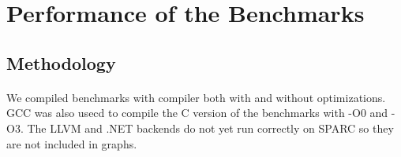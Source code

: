 \documentclass[12pt]{article}
\begin{document}
\section{Performance of the Benchmarks}
\subsection{Methodology}
\paragraph{}
We compiled benchmarks with compiler both with and without optimizations.  GCC was also usecd to compile the C version of the benchmarks with -O0 and -O3.
The LLVM and .NET backends do not yet run correctly on SPARC so they are not included in graphs.

  
\end{document}

